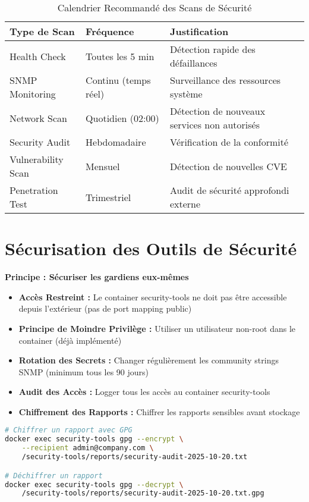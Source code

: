 \documentclass[11pt,a4paper]{report}
\begin{document}
\begin{table}[H]
\centering
\caption{Calendrier Recommandé des Scans de Sécurité}
\label{tab:scan_schedule}
\begin{tabular}{|l|l|p{6cm}|}
\hline
\textbf{Type de Scan} & \textbf{Fréquence} & \textbf{Justification} \\
\hline
Health Check & Toutes les 5 min & Détection rapide des défaillances \\
\hline
SNMP Monitoring & Continu (temps réel) & Surveillance des ressources système \\
\hline
Network Scan & Quotidien (02:00) & Détection de nouveaux services non autorisés \\
\hline
Security Audit & Hebdomadaire & Vérification de la conformité \\
\hline
Vulnerability Scan & Mensuel & Détection de nouvelles CVE \\
\hline
Penetration Test & Trimestriel & Audit de sécurité approfondi externe \\
\hline
\end{tabular}
\end{table}

\section{Sécurisation des Outils de Sécurité}

\textbf{Principe : Sécuriser les gardiens eux-mêmes}

\begin{itemize}
    \item \textbf{Accès Restreint :} Le container security-tools ne doit pas être accessible depuis l'extérieur (pas de port mapping public)
    \item \textbf{Principe de Moindre Privilège :} Utiliser un utilisateur non-root dans le container (déjà implémenté)
    \item \textbf{Rotation des Secrets :} Changer régulièrement les community strings SNMP (minimum tous les 90 jours)
    \item \textbf{Audit des Accès :} Logger tous les accès au container security-tools
    \item \textbf{Chiffrement des Rapports :} Chiffrer les rapports sensibles avant stockage
\end{itemize}

\begin{lstlisting}[language=bash, caption=Exemple de Chiffrement des Rapports]
# Chiffrer un rapport avec GPG
docker exec security-tools gpg --encrypt \
    --recipient admin@company.com \
    /security-tools/reports/security-audit-2025-10-20.txt

# Déchiffrer un rapport
docker exec security-tools gpg --decrypt \
    /security-tools/reports/security-audit-2025-10-20.txt.gpg
\end{lstlisting}
\end{document}
